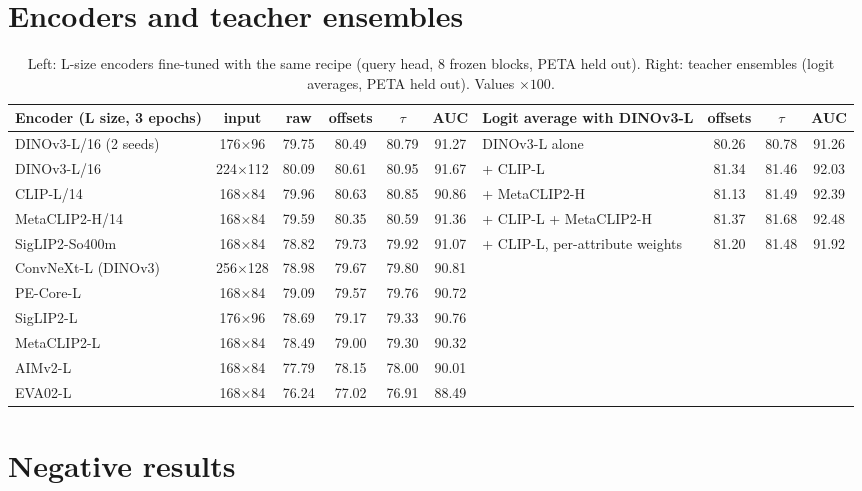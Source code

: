 \documentclass[10pt,twocolumn,letterpaper]{article}
\begin{document}
\section{Encoders and teacher ensembles}
\label{app:encoders}

\begin{table}[h]
\centering\small
\begin{tabular}{@{}lccccc|lccc@{}}
\toprule
Encoder (L size, 3 epochs) & input & raw & offsets & $\tau$ & AUC & Logit average with DINOv3-L & offsets & $\tau$ & AUC \\
\midrule
DINOv3-L/16 (2 seeds) & 176$\times$96 & 79.75 & 80.49 & 80.79 & 91.27 & DINOv3-L alone & 80.26 & 80.78 & 91.26 \\
DINOv3-L/16 & 224$\times$112 & 80.09 & 80.61 & 80.95 & 91.67 & + CLIP-L & 81.34 & 81.46 & 92.03 \\
CLIP-L/14~\cite{clip} & 168$\times$84 & 79.96 & 80.63 & 80.85 & 90.86 & + MetaCLIP2-H & 81.13 & 81.49 & 92.39 \\
MetaCLIP2-H/14~\cite{metaclip2} & 168$\times$84 & 79.59 & 80.35 & 80.59 & 91.36 & + CLIP-L + MetaCLIP2-H & 81.37 & 81.68 & 92.48 \\
SigLIP2-So400m~\cite{siglip2} & 168$\times$84 & 78.82 & 79.73 & 79.92 & 91.07 & + CLIP-L, per-attribute weights & 81.20 & 81.48 & 91.92 \\
ConvNeXt-L (DINOv3)~\cite{convnext} & 256$\times$128 & 78.98 & 79.67 & 79.80 & 90.81 & & & & \\
PE-Core-L~\cite{pe} & 168$\times$84 & 79.09 & 79.57 & 79.76 & 90.72 & & & & \\
SigLIP2-L & 176$\times$96 & 78.69 & 79.17 & 79.33 & 90.76 & & & & \\
MetaCLIP2-L & 168$\times$84 & 78.49 & 79.00 & 79.30 & 90.32 & & & & \\
AIMv2-L~\cite{aimv2} & 168$\times$84 & 77.79 & 78.15 & 78.00 & 90.01 & & & & \\
EVA02-L~\cite{eva02} & 168$\times$84 & 76.24 & 77.02 & 76.91 & 88.49 & & & & \\
\bottomrule
\end{tabular}
\caption{Left: L-size encoders fine-tuned with the same recipe (query head, 8 frozen blocks, PETA held out). Right: teacher ensembles (logit averages, PETA held out). Values $\times100$.}
\end{table}

\section{Negative results}
\label{app:neg}
\end{document}
